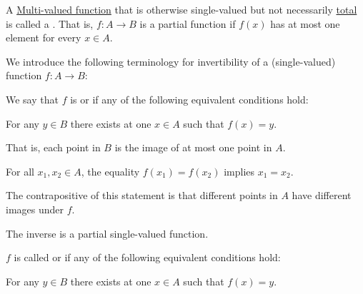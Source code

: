 \begin{definition}\label{def:partial_function}
  A \hyperref[def:multi_valued_function]{Multi-valued function} that is otherwise single-valued but not necessarily \hyperref[def:multi_valued_function/total]{total} is called a . That is, \( f: A \to B \) is a partial function if \( f(x) \) has at most one element for every \( x \in A \).
\end{definition}

\begin{definition}\label{def:function_invertibility}
  We introduce the following terminology for invertibility of a (single-valued) function \( f: A \to B \):
  \begin{thmenum}
    \begin{minipage}[t]{0.43\textwidth}
       We say that \( f \) is  or  if any of the following equivalent conditions hold:
      \begin{thmenum}
         For any \( y \in B \) there exists at  one \( x \in A \) such that \( f(x) = y \).

        That is, each point in \( B \) is the image of at most one point in \( A \).
        \newline

         For all \( x_1, x_2 \in A \), the equality \( f(x_1) = f(x_2) \) implies \( x_1 = x_2 \).

        The contrapositive of this statement is that different points in \( A \) have different images under \( f \).

         The inverse is a partial single-valued function.
      \end{thmenum}
    \end{minipage}
    \hfill
    \begin{minipage}[t]{0.44\textwidth}
       \( f \) is called  or  if any of the following equivalent conditions hold:
      \newline
      \begin{thmenum}[leftmargin=0.9cm]
         For any \( y \in B \) there exists at  one \( x \in A \) such that \( f(x) = y \).


\end{thmenum}
\end{minipage}
\end{thmenum}
\end{definition}
